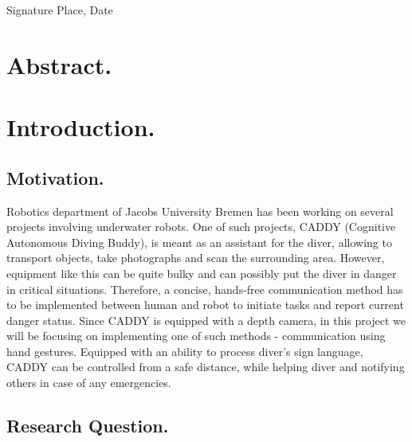 \documentclass[a4paper,11pt,oneside]{article}
\begin{document}
\vspace{20mm}

Signature \hfill Place, Date

\newpage

\section*{Abstract.}



\newpage
\tableofcontents

\clearpage
{}

\section{Introduction.}

\subsection{Motivation.}


Robotics department of Jacobs University Bremen has been working on several projects involving underwater robots. One of such projects, CADDY (Cognitive Autonomous Diving Buddy), is meant as an assistant for the diver, allowing to transport objects, take photographs and scan the surrounding area. However, equipment like this can be quite bulky and can possibly put the diver in danger in critical situations. Therefore, a concise, hands-free communication method has to be implemented between human and robot to initiate tasks and report current danger status. Since CADDY is equipped with a depth camera, in this project we will be focusing on implementing one of such methods - communication using hand gestures. Equipped with an ability to process diver's sign language, CADDY can be controlled from a safe distance, while helping diver and notifying others in case of any emergencies.

\subsection{Research Question.}
\end{document}
